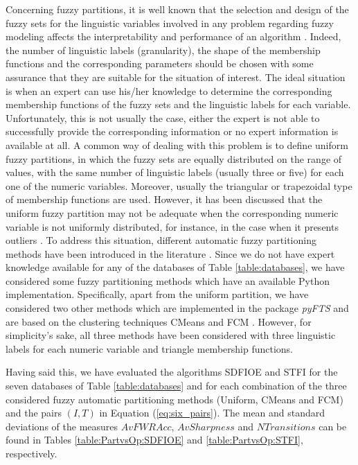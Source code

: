 Concerning fuzzy partitions, it is well known that the selection and design of the fuzzy sets for the linguistic variables involved in any problem regarding fuzzy modeling affects the interpretability and performance of an algorithm \cite{Cordon2000}. Indeed, the number of linguistic labels (granularity), the shape of the membership functions and the corresponding parameters should be chosen with some assurance that they are suitable for the situation of interest. The ideal situation is when an expert can use his/her knowledge to determine the corresponding membership functions of the fuzzy sets and the linguistic labels for each variable. Unfortunately, this is not usually the case, either the expert is not able to successfully provide the corresponding information or no expert information is available at all. A common way of dealing with this problem is to define uniform fuzzy partitions, in which the fuzzy sets are equally distributed on the range of values, with the same number of linguistic labels (usually three or five) for each one of the numeric variables. Moreover, usually the triangular or trapezoidal type of membership functions are used. However, it has been discussed that the uniform fuzzy partition may not be adequate when the corresponding numeric variable is not uniformly distributed, for instance, in the case when it presents outliers \cite{Li2008,Uriz2020}. To address this situation, different automatic fuzzy partitioning methods have been introduced in the literature \cite{Uriz2020}. Since we do not have expert knowledge available for any of the databases of Table \ref{table:databases}, we have considered some fuzzy partitioning methods which have an available Python implementation. Specifically, apart from the uniform partition, we have considered two other methods which are implemented in the package \textit{pyFTS} \cite{Petronio2019} and are based on the clustering techniques CMeans and FCM \cite{Li2008,Bezdek1981}. However, for simplicity's sake, all three methods have been considered with three linguistic labels for each numeric variable and triangle membership functions.

Having said this, we have evaluated the algorithms SDFIOE and STFI for the seven databases of Table \ref{table:databases} and for each combination of the three considered fuzzy automatic partitioning methods (Uniform, CMeans and FCM) and the pairs $(I,T)$ in Equation (\ref{eq:six_pairs}). The mean and standard deviations of the measures $AvFWRAcc$, $AvSharpness$ and $NTransitions$ can be found in Tables \ref{table:PartvsOp:SDFIOE} and \ref{table:PartvsOp:STFI}, respectively.

